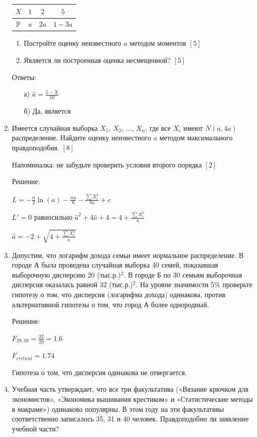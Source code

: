 \documentclass[12pt, a4paper]{article}\usepackage[]{graphicx}\usepackage[]{color}
\begin{document}
\begin{enumerate}
\begin{tabular}{|c|c|c|c|}
\hline
$X$ & $1$ & $2$ & $5$ \\
\hline
$\P$ & $a$ & $2a$ & $1-3a$ \\
\hline
\end{tabular}
\begin{enumerate}
\item Постройте оценку неизвестного $a$ методом моментов $[5]$
\item Является ли построенная оценка несмещенной? $[5]$
\end{enumerate}

Ответы:
\begin{enumerate}
\item[а)] $\hat{a}=\frac{5-\bar{X}}{10}$
\item[б)] Да, является
\end{enumerate}

\item Имеется случайная выборка $X_{1}$, $X_{2}$, ..., $X_{n}$, где все $X_{i}$ имеют $N(a,4a)$ распределение.
Найдите оценку неизвестного $a$ методом максимального правдоподобия. $[8]$

Напоминалка: не забудьте проверить условия второго порядка $[2]$

Решение:

$L=-\frac{n}{2}\ln(a)-\frac{na}{8}-\frac{\sum X_{i}^{2}}{8a}+c$

$L'=0$ равносильно $\hat{a}^{2}+4\hat{a}+4=4+\frac{\sum X_{i}^{2}}{n}$

$\hat{a}=-2+\sqrt{4+\frac{\sum X_{i}^{2}}{n}}$

\item Допустим, что логарифм дохода семьи имеет нормальное распределение. В городе А была проведена случайная выборка 40 семей, показавшая выборочную дисперсию 20 (тыс.р.)$^{2}$. В городе Б по 30 семьям выборочная дисперсия оказалась равной 32 (тыс.р.)$^{2}$.
На уровне значимости 5\% проверьте гипотезу о том, что дисперсия (логарифма дохода) одинакова, против альтернативной гипотезы о том, что город А более однородный.

Решение:

$F_{29,39}=\frac{32}{20}=1.6$

$F_{critical}=1.74$

Гипотеза о том, что дисперсия одинакова не отвергается.

\item Учебная часть утверждает, что все три факультатива («Вязание крючком для экономистов», «Экономика вышивания крестиком» и «Статистические методы в макраме») одинаково популярны. В этом году на эти факультативы соответственно записалось 35, 31 и 40 человек. Правдоподобно ли заявление учебной части?


\end{enumerate}
\end{document}
